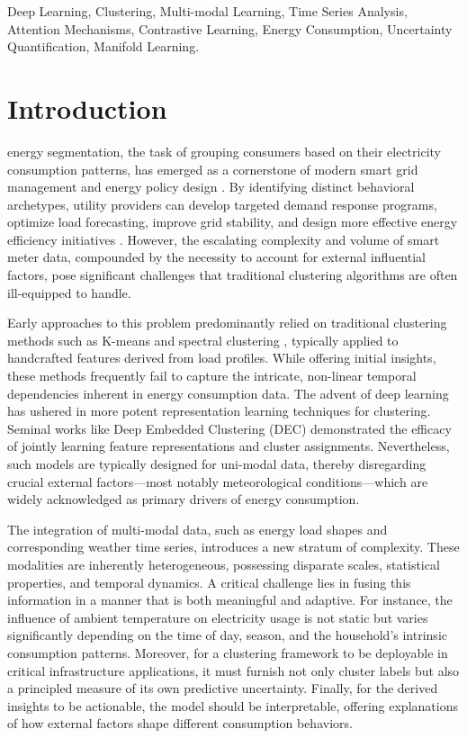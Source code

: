 \documentclass[journal]{IEEEtran}
\begin{document}
\begin{IEEEkeywords}
Deep Learning, Clustering, Multi-modal Learning, Time Series Analysis, Attention Mechanisms, Contrastive Learning, Energy Consumption, Uncertainty Quantification, Manifold Learning.
\end{IEEEkeywords}


\section{Introduction}
 energy segmentation, the task of grouping consumers based on their electricity consumption patterns, has emerged as a cornerstone of modern smart grid management and energy policy design \cite{smart_grid_review}. By identifying distinct behavioral archetypes, utility providers can develop targeted demand response programs, optimize load forecasting, improve grid stability, and design more effective energy efficiency initiatives \cite{demand_response_survey}. However, the escalating complexity and volume of smart meter data, compounded by the necessity to account for external influential factors, pose significant challenges that traditional clustering algorithms are often ill-equipped to handle.

Early approaches to this problem predominantly relied on traditional clustering methods such as K-means \cite{kmeans_clustering} and spectral clustering \cite{spectral_clustering}, typically applied to handcrafted features derived from load profiles. While offering initial insights, these methods frequently fail to capture the intricate, non-linear temporal dependencies inherent in energy consumption data. The advent of deep learning has ushered in more potent representation learning techniques for clustering. Seminal works like Deep Embedded Clustering (DEC) \cite{deep_embedding_clustering_xie} demonstrated the efficacy of jointly learning feature representations and cluster assignments. Nevertheless, such models are typically designed for uni-modal data, thereby disregarding crucial external factors—most notably meteorological conditions—which are widely acknowledged as primary drivers of energy consumption.

The integration of multi-modal data, such as energy load shapes and corresponding weather time series, introduces a new stratum of complexity. These modalities are inherently heterogeneous, possessing disparate scales, statistical properties, and temporal dynamics. A critical challenge lies in fusing this information in a manner that is both meaningful and adaptive. For instance, the influence of ambient temperature on electricity usage is not static but varies significantly depending on the time of day, season, and the household's intrinsic consumption patterns. Moreover, for a clustering framework to be deployable in critical infrastructure applications, it must furnish not only cluster labels but also a principled measure of its own predictive uncertainty. Finally, for the derived insights to be actionable, the model should be interpretable, offering explanations of how external factors shape different consumption behaviors.
\end{document}
